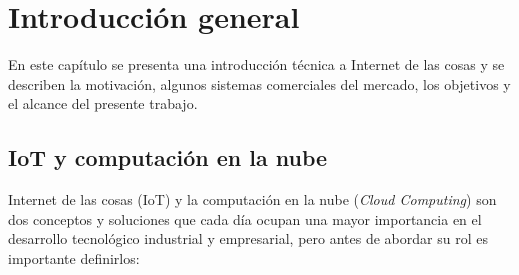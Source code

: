 
\chapter{Introducción general} %

\label{Chapter1} %
\label{IntroGeneral}
En este capítulo se presenta una introducción técnica a Internet de las cosas y se describen la motivación, algunos sistemas comerciales del mercado, los objetivos y el alcance del presente trabajo.

\newcommand{\keyword}[1]{\textbf{#1}}
\newcommand{\tabhead}[1]{\textbf{#1}}
\newcommand{\code}[1]{\texttt{#1}}
\newcommand{\file}[1]{\texttt{\bfseries#1}}
\newcommand{\option}[1]{\texttt{\itshape#1}}
\newcommand{\grados}{$^{\circ}$}






\section{IoT y computación en la nube}

Internet de las cosas (IoT) y la computación en la nube (\emph{Cloud Computing}) son dos conceptos y soluciones que cada día ocupan una mayor importancia en el desarrollo tecnológico industrial y empresarial, pero antes de abordar su rol es importante definirlos:

